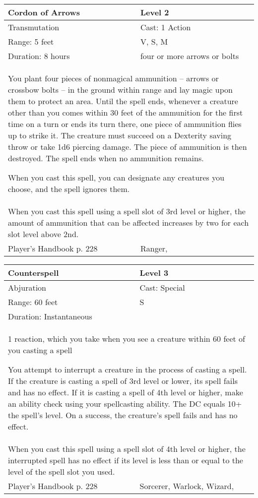 \documentclass[11pt]{report}
\begin{document}
\begin{table}[H]
	\begin{tabular}{||p{6cm}|p{6cm}||}
		\hline\hline
		\bf{Cordon of Arrows} & Level 2\\ \hline
		Transmutation & Cast: 1 Action\\ \hline
		Range: 5 feet & V, S, M\\ \hline
		Duration: 8 hours & four or more arrows or bolts\\ \hline
		\multicolumn{2}{||p{12cm}||}{You plant four pieces of nonmagical ammunition – arrows or crossbow bolts – in the ground within range and lay magic upon them to protect an area. 
Until the spell ends, whenever a creature other than you comes within 30 feet of the ammunition for the first time on a turn or ends its turn there, one piece of ammunition flies up to strike it. The creature must succeed on a Dexterity saving throw or take 1d6 piercing damage. The piece of ammunition is then destroyed. The spell ends when no ammunition remains. 

When you cast this spell, you can designate any creatures you choose, and the spell ignores them.}\\ \hline
		\multicolumn{2}{||p{12cm}||}{When you cast this spell using a spell slot of 3rd level or higher, the amount of ammunition that can be affected increases by two for each slot level above 2nd.}\\ \hline
Player's Handbook p. 228 & Ranger, \\ \hline\hline
	\end{tabular}
\end{table}

\begin{table}[H]
	\begin{tabular}{||p{6cm}|p{6cm}||}
		\hline\hline
		\bf{Counterspell} & Level 3\\ \hline
		Abjuration & Cast: Special\\ \hline
		Range: 60 feet & S\\ \hline
		Duration: Instantaneous & \\ \hline
		\multicolumn{2}{||p{12cm}||}{1 reaction, which you take when you see a creature within 60 feet of you casting a spell

You attempt to interrupt a creature in the process of casting a spell. If the creature is casting a spell of 3rd level or lower, its spell fails and has no effect. If it is casting a spell of 4th level or higher, make an ability check using your spellcasting ability.  The DC equals 10+ the spell’s level. On a success, the creature’s spell fails and has no effect.}\\ \hline
		\multicolumn{2}{||p{12cm}||}{When you cast this spell using a spell slot of 4th level or higher, the interrupted spell has no effect if its level is less than or equal to the level of the spell slot you used.}\\ \hline
Player's Handbook p. 228 & Sorcerer, Warlock, Wizard, \\ \hline\hline
	\end{tabular}
\end{table}
\end{document}
